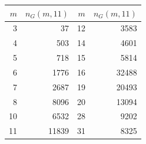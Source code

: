 \begin{center}\begin{tabular}{rr@{\qquad}rr}\toprule
$m$&$n_G(m,11)$&$m$&$n_G(m,11)$\\\midrule
3&37&12&3583\\
4&503&14&4601\\
5&718&15&5814\\
6&1776&16&32488\\
7&2687&19&20493\\
8&8096&20&13094\\
10&6532&28&9202\\
11&11839&31&8325\\
\bottomrule\end{tabular}\end{center}
